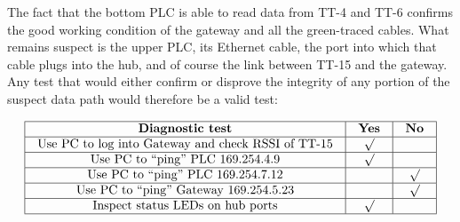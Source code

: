 The fact that the bottom PLC is able to read data from TT-4 and TT-6 confirms the good working condition of the gateway and all the green-traced cables.  What remains suspect is the upper PLC, its Ethernet cable, the port into which that cable plugs into the hub, and of course the link between TT-15 and the gateway.  Any test that would either confirm or disprove the integrity of any portion of the suspect data path would therefore be a valid test:


$$\vbox{\offinterlineskip
\halign{\strut
\vrule \quad\hfil # \ \hfil & 
\vrule \quad\hfil # \ \hfil & 
\vrule \quad\hfil # \ \hfil \vrule \cr
\noalign{\hrule}
%
{\bf Diagnostic test} & {\bf Yes} & {\bf No} \cr
%
\noalign{\hrule}
%
Use PC to log into Gateway and check RSSI of TT-15 & $\surd$ &  \cr
%
\noalign{\hrule}
%
Use PC to ``ping'' PLC 169.254.4.9 & $\surd$ &  \cr
%
\noalign{\hrule}
%
Use PC to ``ping'' PLC 169.254.7.12 &  & $\surd$ \cr
%
\noalign{\hrule}
%
Use PC to ``ping'' Gateway 169.254.5.23 &  & $\surd$ \cr
%
\noalign{\hrule}
%
Inspect status LEDs on hub ports & $\surd$ &  \cr
%
\noalign{\hrule}
} %
}$$ %





